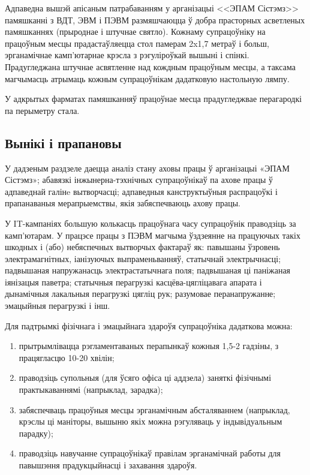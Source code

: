 Адпаведна вышэй апісаным патрабаванням у арганізацыі <<ЭПАМ Сістэмз>> памяшканні з ВДТ, ЭВМ і ПЭВМ размяшчаюцца ў добра прасторных асветленых памяшканнях 
(прыроднае і штучнае святло). Кожнаму супрацоўніку на працоўным месцы
прадастаўляецца стол памерам 2x1,7 метраў і больш, эрганамічнае камп'ютарнае крэсла з рэгуліроўкай вышыні і спінкі. Прадугледжана
штучнае асвятленне над кождным працоўным месцы, а таксама магчымасць атрымаць кожным супрацоўнікам дадатковую настольную лямпу.

У адкрытых фарматах памяшканняў працоўнае месца прадугледжвае
перагародкі па перыметру стала.

\subsection{Вынікі і прапановы}

У дадзеным раздзеле даецца аналіз стану аховы працы ў арганізацыі «ЭПАМ Сістэмз»; абавязкі інжынерна-тэхнічных супрацоўнікаў па ахове працы ў адпаведнай галінe вытворчасці; адпаведныя канструктыўныя распрацоўкі і прапанаваныя мерапрыемствы, якія забяспечваюць ахову працы.

У IT-кампаніях большую колькасць працоўнага часу супрацоўнік праводзіць за кам\-п'ю\-та\-рам. У працэсе працы з ПЭВМ магчыма ўздзеянне на працуючых такіх шкодных і (або) небяспечных вытворчых фактараў як: павышаны ўзровень электрамагнітных, іанізуючых выпраменьванняў, статычнай электрычнасці; падвышаная напружанасць электрастатычнага поля; падвышаная ці паніжаная іянізацыя паветра; статычныя перагрузкі касцёва-цягліцавага апарата і дынамічныя лакальныя перагрузкі цягліц рук; разумовае перанапружанне; эмацыйныя перагрузкі і інш.

Для падтрымкі фізічнага і эмацыйнага здароўя супрацоўніка дадаткова можна:
\begin{enumerate}
    \item прытрымлівацца рэгламентаваных перапынкаў кожныя 1,5-2 гадзіны, з працягласцю 10-20 хвілін;
    \item праводзіць супольныя (для ўсяго офіса ці аддзела) заняткі фізічнымі практыкаваннямі (напрыклад, зарадка);
    \item забяспечваць працоўныя месцы эрганамічным абсталяваннем (напрыклад, крэслы ці маніторы, вышыню якіх можна рэгуляваць у індывідуальным парадку);
    \item праводзіць навучанне супрацоўнікаў правілам эрганамічнай работы для павышэння прадукцыйнасці і захавання здароўя.
\end{enumerate}
